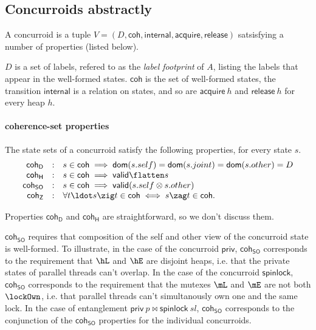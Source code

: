 \subsection{Concurroids abstractly}

A concurroid is a tuple $V = (D, \mathsf{coh},
\mathsf{internal}, \mathsf{acquire}, \mathsf{release})$ satsisfying a
number of properties (listed below).

$D$ is a set of labels, refered to as the \emph{label footprint} of $A$,
listing the labels that appear in the well-formed
states. $\mathsf{coh}$ is the set of well-formed states, the
transition $\mathsf{internal}$ is a relation on states, and so are
$\mathsf{acquire}\ h$ and $\mathsf{release}\ h$ for every heap $h$.


\paragraph{coherence-set properties}

The state sets of a concurroid satisfy the following properties, for
every state $s$.
\[
\begin{array}{rcl}
\mathsf{coh_D} & : & s \in \mathsf{coh} \implies \mathsf{dom}(s.self) = \mathsf{dom}(s.joint) = \mathsf{dom}(s.other) = D\\
\mathsf{coh_H} & : & s \in \mathsf{coh} \implies \mathsf{valid}{\flatten s}\\
\mathsf{coh_{SO}} & : & s \in \mathsf{coh} \implies \mathsf{valid}(s.self \otimes s.other)\\
\mathsf{coh_Z} & : & \forall t\ldot s \zig t \in \mathsf{coh} \iff s \zag t \in \mathsf{coh}.
\end{array}
\]

Properties $\mathsf{coh_D}$ and $\mathsf{coh_H}$ are straightforward,
so we don't discuss them.  

$\mathsf{coh_{SO}}$ requires that composition of the self and other
view of the concurroid state is well-formed. To illustrate, in the
case of the concurroid $\mathsf{priv}$, $\mathsf{coh_{SO}}$
corresponds to the requirement that $\hL$ and $\hE$ are disjoint
heaps, i.e. that the private states of parallel threads can't
overlap. In the case of the concurroid $\mathsf{spinlock}$,
$\mathsf{coh_{SO}}$ corresponds to the requirement that the mutexes
$\mL$ and $\mE$ are not both $\lockOwn$, i.e. that parallel threads
can't simultanously own one and the same lock. In the case of
entanglement $\mathsf{priv}\ p \bowtie \mathsf{spinlock}\ sl$,
$\mathsf{coh_{SO}}$ corresponds to the conjunction of the
$\mathsf{coh_{SO}}$ properties for the individual concurroids.

